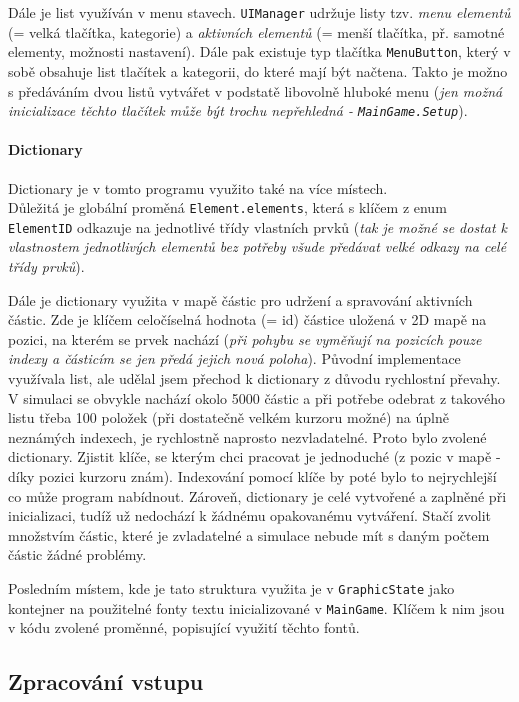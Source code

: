 \documentclass[a4paper, 12pt]{article}
\begin{document}
Dále je list využíván v menu stavech. \texttt{UIManager} udržuje listy tzv.
\emph{menu elementů} (= velká tlačítka, kategorie) a \emph{aktivních elementů}
(= menší tlačítka, př. samotné elementy, možnosti nastavení). Dále pak existuje
typ tlačítka \texttt{MenuButton}, který v sobě obsahuje list tlačítek a
kategorii, do které mají být načtena. Takto je možno s předáváním dvou listů
vytvářet v podstatě libovolně hluboké menu (\emph{jen možná inicializace těchto
tlačítek může být trochu nepřehledná - \texttt{MainGame.Setup}}).

\paragraph{Dictionary}
Dictionary je v tomto programu využito také na více místech. \\Důležitá je
globální proměná \texttt{Element.elements}, která s klíčem z enum
\texttt{ElementID} odkazuje na jednotlivé třídy vlastních prvků (\emph{tak je možné
se dostat k vlastnostem jednotlivých elementů bez potřeby všude předávat velké
odkazy na celé třídy prvků}).

Dále je dictionary využita v mapě částic pro udržení a spravování aktivních
částic. Zde je klíčem celočíselná hodnota (= id) částice uložená v 2D mapě na pozici, 
na kterém se prvek nachází (\emph{při pohybu se vyměňují na pozicích pouze indexy 
a částicím se jen předá jejich nová poloha}). Původní implementace využívala 
list, ale udělal jsem přechod k dictionary z důvodu rychlostní převahy. 
V simulaci se obvykle nachází okolo 5000 částic a při potřebe odebrat z 
takového listu třeba 100 položek (při dostatečně velkém kurzoru možné) na úplně 
neznámých indexech, je rychlostně naprosto nezvladatelné. Proto bylo zvolené 
dictionary. Zjistit klíče, se kterým chci pracovat je jednoduché (z pozic 
v mapě - díky pozici kurzoru znám). Indexování pomocí klíče by poté bylo to 
nejrychlejší co může program nabídnout. Zároveň, dictionary je celé vytvořené 
a zaplněné při inicializaci, tudíž už nedochází k žádnému opakovanému vytváření. 
Stačí zvolit množstvím částic, které je zvladatelné a simulace nebude mít s 
daným počtem částic žádné problémy.

Posledním místem, kde je tato struktura využita je v \texttt{GraphicState} jako
kontejner na použitelné fonty textu inicializované v \texttt{MainGame}. Klíčem
k nim jsou v kódu zvolené proměnné, popisující využití těchto fontů.

\newpage
\subsection{Zpracování vstupu}
\end{document}
